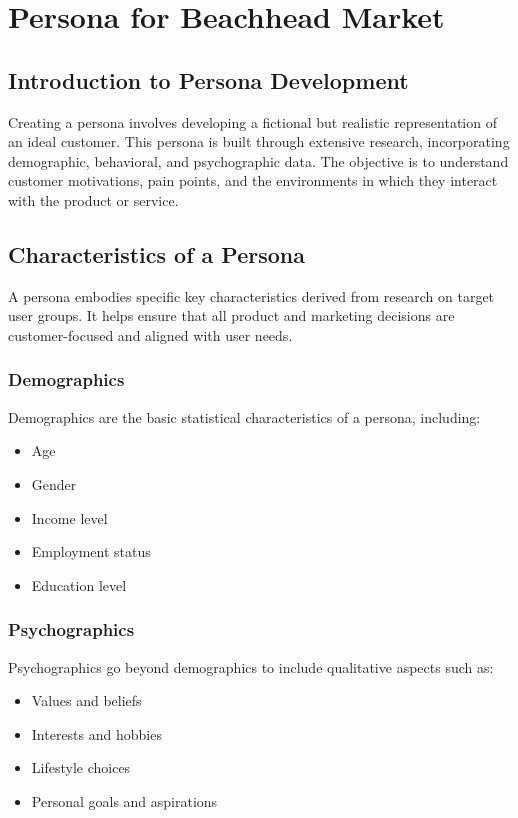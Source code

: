 \documentclass[a4paper,11pt]{article}
\begin{document}
\section{Persona for Beachhead Market}

\subsection{Introduction to Persona Development}
Creating a persona involves developing a fictional but realistic representation of an ideal customer. This persona is built through extensive research, incorporating demographic, behavioral, and psychographic data. The objective is to understand customer motivations, pain points, and the environments in which they interact with the product or service.

\subsection{Characteristics of a Persona}
A persona embodies specific key characteristics derived from research on target user groups. It helps ensure that all product and marketing decisions are customer-focused and aligned with user needs.

\subsubsection{Demographics}
Demographics are the basic statistical characteristics of a persona, including:

\begin{itemize}
    \item Age
    \item Gender
    \item Income level
    \item Employment status
    \item Education level
\end{itemize}

\subsubsection{Psychographics}
Psychographics go beyond demographics to include qualitative aspects such as:

\begin{itemize}
    \item Values and beliefs
    \item Interests and hobbies
    \item Lifestyle choices
    \item Personal goals and aspirations
\end{itemize}
\end{document}
